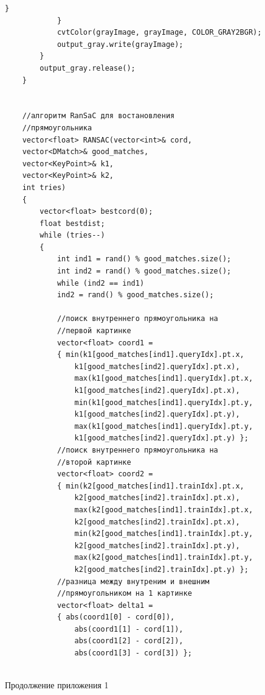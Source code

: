 \documentclass[14pt, a4paper]{extreport}
\begin{document}
\begin{Verbatim}[fontseries=c, fontsize=\fontsize{10pt}{12pt}\selectfont]
				}
			}
			cvtColor(grayImage, grayImage, COLOR_GRAY2BGR);
			output_gray.write(grayImage);
		}
		output_gray.release();
	}
	
	
	//алгоритм RanSaC для востановления
	//прямоугольника
	vector<float> RANSAC(vector<int>& cord,
	vector<DMatch>& good_matches,
	vector<KeyPoint>& k1,
	vector<KeyPoint>& k2,
	int tries)
	{
		vector<float> bestcord(0);
		float bestdist;
		while (tries--)
		{
			int ind1 = rand() % good_matches.size();
			int ind2 = rand() % good_matches.size();
			while (ind2 == ind1) 
			ind2 = rand() % good_matches.size();
			
			//поиск внутреннего прямоугольника на 
			//первой картинке
			vector<float> coord1 = 
			{ min(k1[good_matches[ind1].queryIdx].pt.x,
				k1[good_matches[ind2].queryIdx].pt.x),
				max(k1[good_matches[ind1].queryIdx].pt.x,
				k1[good_matches[ind2].queryIdx].pt.x),
				min(k1[good_matches[ind1].queryIdx].pt.y,
				k1[good_matches[ind2].queryIdx].pt.y),
				max(k1[good_matches[ind1].queryIdx].pt.y,
				k1[good_matches[ind2].queryIdx].pt.y) };
			//поиск внутреннего прямоугольника на 
			//второй картинке 
			vector<float> coord2 = 
			{ min(k2[good_matches[ind1].trainIdx].pt.x,
				k2[good_matches[ind2].trainIdx].pt.x),
				max(k2[good_matches[ind1].trainIdx].pt.x,
				k2[good_matches[ind2].trainIdx].pt.x),
				min(k2[good_matches[ind1].trainIdx].pt.y,
				k2[good_matches[ind2].trainIdx].pt.y),
				max(k2[good_matches[ind1].trainIdx].pt.y,
				k2[good_matches[ind2].trainIdx].pt.y) };
			//разница между внутреним и внешним 
			//прямоугольником на 1 картинке
			vector<float> delta1 = 
			{ abs(coord1[0] - cord[0]),
				abs(coord1[1] - cord[1]),
				abs(coord1[2] - cord[2]),
				abs(coord1[3] - cord[3]) };
			
\end{Verbatim}
\noindent Продолжение приложения 1
\end{document}
